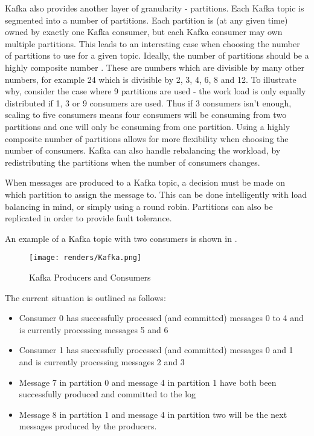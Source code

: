 Kafka also provides another layer of granularity - partitions. Each Kafka topic is segmented into a number of partitions. Each partition is (at any given time) owned by exactly one Kafka consumer, but each Kafka consumer may own multiple partitions. This leads to an interesting case when choosing the number of partitions to use for a given topic. Ideally, the number of partitions should be a highly composite number \cite {highlyCompositeNumbers}. These are numbers which are divisible by many other numbers, for example 24 which is divisible by 2, 3, 4, 6, 8 and 12. To illustrate why, consider the case where 9 partitions are used - the work load is only equally distributed if 1, 3 or 9 consumers are used. Thus if 3 consumers isn't enough, scaling to five consumers means four consumers will be consuming from two partitions and one will only be consuming from one partition. Using a highly composite number of partitions allows for more flexibility when choosing the number of consumers. Kafka can also handle rebalancing the workload, by redistributing the partitions when the number of consumers changes. 

When messages are produced to a Kafka topic, a decision must be made on which partition to assign the message to. This can be done intelligently with load balancing in mind, or simply using a round robin. Partitions can also be replicated in order to provide fault tolerance.

An example of a Kafka topic with two consumers is shown in . 

\begin{figure}[H]
      \centering
      \texttt{[image: renders/Kafka.png]}
      \caption{Kafka Producers and Consumers}
      \label{fig:kafka}
\end{figure}  

The current situation is outlined as follows:
\begin{itemize}
\item{Consumer 0 has successfully processed (and committed) messages 0 to 4 and is currently processing messages 5 and 6}
\item{Consumer 1 has successfully processed (and committed) messages 0 and 1 and is currently processing messages 2 and 3}
\item{Message 7 in partition 0 and message 4 in partition 1 have both been successfully produced and committed to the log}
\item{Message 8 in partition 1 and message 4 in partition two will be the next messages produced by the producers.}
\end{itemize}


